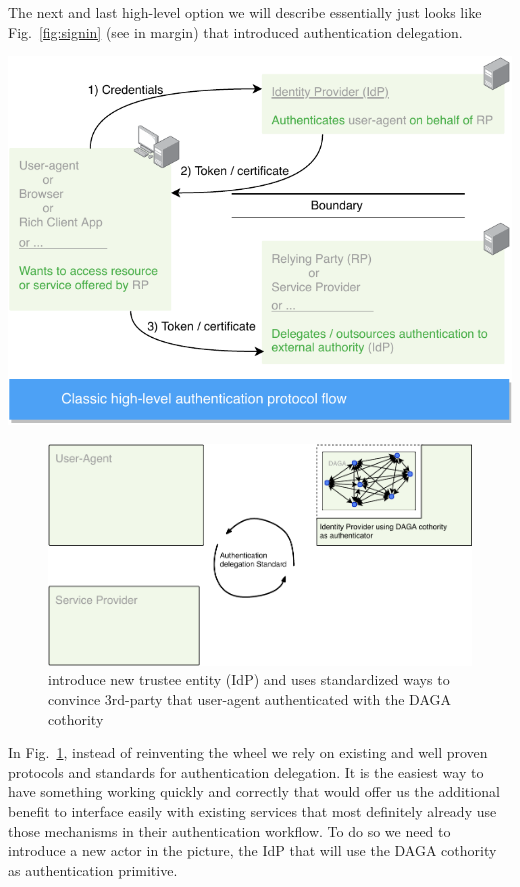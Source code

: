     The next and last high-level option we will describe essentially just looks like Fig.~\ref{fig:signin} (see in margin) that introduced
    authentication delegation.
    \begin{marginfigure}
        \includegraphics[width=\linewidth]{images/signIn.pdf}
    \end{marginfigure}
    \begin{figure}
        \includegraphics[width=\linewidth]{images/login3_daga.pdf}
        \caption{introduce new trustee entity (IdP) and uses standardized ways to convince 3rd-party that user-agent authenticated with the DAGA cothority}
        \label{fig:login3}
    \end{figure}
    In Fig.~\ref{fig:login3}, instead of reinventing the wheel we rely on existing and well proven protocols and standards for authentication delegation.
    It is the easiest way to have something working quickly and correctly that would offer us the additional benefit to interface easily with existing services that most definitely already use those mechanisms
    in their authentication workflow.
    To do so we need to introduce a new actor in the picture, the IdP that will use the DAGA cothority as authentication primitive.

